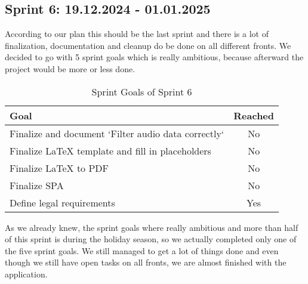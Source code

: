 \subsection{Sprint 6: 19.12.2024 - 01.01.2025}\label{subsec:sprint-6}
According to our plan this should be the last sprint and there is a lot of finalization,
documentation and cleanup do be done on all different fronts.
We decided to go with 5 sprint goals which is really ambitious, because afterward the project would be more or less done.
\begin{table}[H]
    \centering
    \begin{tabularx}{\textwidth}{X c}
        \toprule
        \textbf{Goal}                                         & \textbf{Reached} \\
        \midrule
        Finalize and document `Filter audio data correctly`   & No               \\
        \midrule
        Finalize LaTeX template and fill in placeholders      & No               \\
        \midrule
        Finalize LaTeX to PDF                                 & No               \\
        \midrule
        Finalize SPA                                          & No               \\
        \midrule
        Define legal requirements                             & Yes               \\
        \bottomrule
    \end{tabularx}
    \caption{Sprint Goals of Sprint 6}\label{tab:sprint_goals6}
\end{table}
As we already knew, the sprint goals where really ambitious and more than half of this sprint is during the holiday season,
so we actually completed only one of the five sprint goals.
We still managed to get a lot of things done and even though we still have open tasks on all fronts,
we are almost finished with the application.

